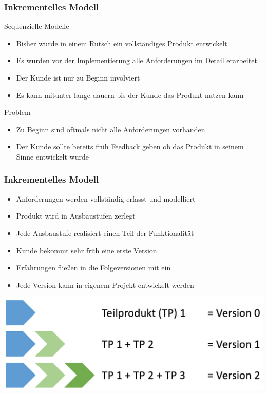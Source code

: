 \begin{frame}
\frametitle{Inkrementelles Modell}
	Sequenzielle Modelle
	\begin{itemize}
		\item Bisher wurde in einem Rutsch ein vollständiges Produkt entwickelt
		\item Es wurden vor der Implementierung alle Anforderungen im Detail erarbeitet
		\item Der Kunde ist nur zu Beginn involviert
		\item Es kann mitunter lange dauern bis der Kunde das Produkt nutzen kann
	\end{itemize}
	\bigskip
	Problem
	\begin{itemize}
		\item Zu Beginn sind oftmals nicht alle Anforderungen vorhanden
		\item Der Kunde sollte bereits früh Feedback geben ob das Produkt in seinem 
		Sinne entwickelt wurde
	\end{itemize}
\end{frame}

\begin{frame}
\frametitle{Inkrementelles Modell}
	\begin{itemize}
		\item Anforderungen werden vollständig erfasst und modelliert
		\item Produkt wird in Ausbaustufen zerlegt
		\item Jede Ausbaustufe realisiert einen Teil der Funktionalität
		\item Kunde bekommt sehr früh eine erste Version
		\item Erfahrungen fließen in die Folgeversionen mit ein
		\item Jede Version kann in eigenem Projekt entwickelt werden
	\end{itemize}
	\center\includegraphics[width=1\textwidth,
		keepaspectratio=true]{bilder/inkrementelles_model.png}
\end{frame}

